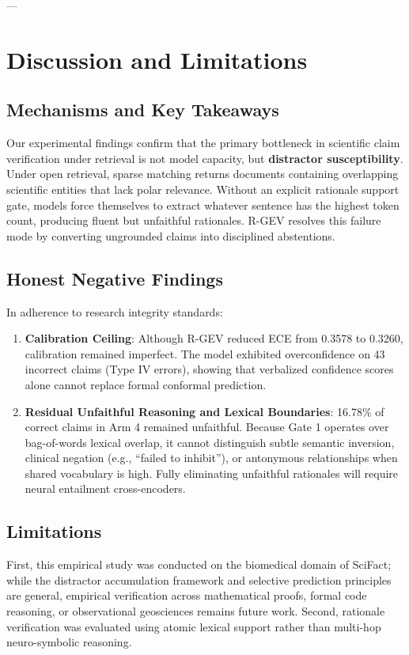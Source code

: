 \documentclass[10pt,journal,compsoc]{IEEEtran}
\begin{document}
---

\section{Discussion and Limitations}

\subsection{Mechanisms and Key Takeaways}
Our experimental findings confirm that the primary bottleneck in scientific claim verification under retrieval is not model capacity, but \textbf{distractor susceptibility}. Under open retrieval, sparse matching returns documents containing overlapping scientific entities that lack polar relevance. Without an explicit rationale support gate, models force themselves to extract whatever sentence has the highest token count, producing fluent but unfaithful rationales. R-GEV resolves this failure mode by converting ungrounded claims into disciplined abstentions.

\subsection{Honest Negative Findings}
In adherence to research integrity standards:
\begin{enumerate}
    \item \textbf{Calibration Ceiling}: Although R-GEV reduced ECE from 0.3578 to 0.3260, calibration remained imperfect. The model exhibited overconfidence on 43 incorrect claims (Type IV errors), showing that verbalized confidence scores alone cannot replace formal conformal prediction.
    \item \textbf{Residual Unfaithful Reasoning and Lexical Boundaries}: 16.78\% of correct claims in Arm 4 remained unfaithful. Because Gate 1 operates over bag-of-words lexical overlap, it cannot distinguish subtle semantic inversion, clinical negation (e.g., ``failed to inhibit''), or antonymous relationships when shared vocabulary is high. Fully eliminating unfaithful rationales will require neural entailment cross-encoders.
\end{enumerate}

\subsection{Limitations}
First, this empirical study was conducted on the biomedical domain of SciFact; while the distractor accumulation framework and selective prediction principles are general, empirical verification across mathematical proofs, formal code reasoning, or observational geosciences remains future work. Second, rationale verification was evaluated using atomic lexical support rather than multi-hop neuro-symbolic reasoning.
\end{document}
